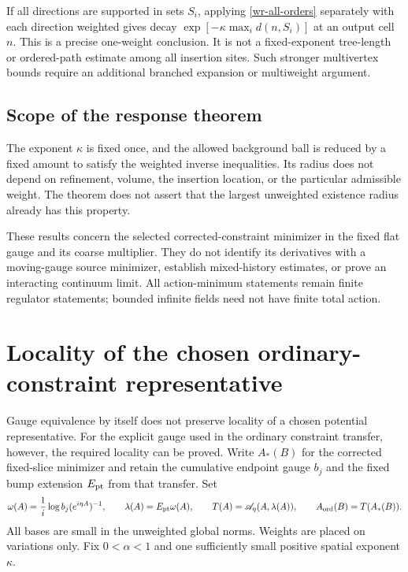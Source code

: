 \documentclass[11pt]{article}
\theoremstyle{remark}
\newcommand{\norm}[1]{\left\|#1\right\|}
\begin{document}
If all directions are supported in sets $S_i$, applying
\eqref{wr-all-orders} separately with each direction weighted
gives decay $\exp[-\kappa\max_i d(n,S_i)]$ at an output cell
$n$. This is a precise one-weight conclusion. It is not a
fixed-exponent tree-length or ordered-path estimate among all
insertion sites. Such stronger multivertex bounds require an
additional branched expansion or multiweight argument.

\subsection{Scope of the response theorem}
\label{wr-scope}

The exponent $\kappa$ is fixed once, and the allowed background
ball is reduced by a fixed amount to satisfy the weighted
inverse inequalities. Its radius does not depend on refinement,
volume, the insertion location, or the particular admissible
weight. The theorem does not assert that the largest unweighted
existence radius already has this property.

These results concern the selected corrected-constraint minimizer
in the fixed flat gauge and its coarse multiplier. They do not
identify its derivatives with a moving-gauge source minimizer,
establish mixed-history estimates, or prove an interacting
continuum limit. All action-minimum statements remain finite
regulator statements; bounded infinite fields need not have finite
total action.


\section{Locality of the chosen ordinary-constraint representative}
\label{or-section}

Gauge equivalence by itself does not preserve locality of a chosen
potential representative. For the explicit gauge used in the ordinary
constraint transfer, however, the required locality can be proved.
Write $A_*(B)$ for the corrected fixed-slice minimizer and retain the
cumulative endpoint gauge $b_j$ and the fixed bump extension
$E_{\rm pt}$ from that transfer. Set
\begin{equation}\label{or-transfer}
 \omega(A)=\frac1i\log b_j(e^{i\eta A})^{-1},\qquad
 \lambda(A)=E_{\rm pt}\omega(A),\qquad
 T(A)=\mathscr A_\eta(A,\lambda(A)),\qquad
 A_{\rm ord}(B)=T(A_*(B)).
\end{equation}
All bases are small in the unweighted global norms. Weights are
placed on variations only. Fix $0<\alpha<1$ and one sufficiently
small positive spatial exponent $\kappa$.
\end{document}
